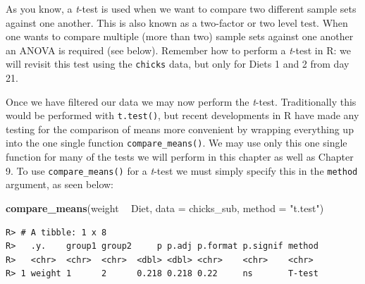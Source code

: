 \documentclass[english,10pt,a4paper,oneside]{book}
\newenvironment{Shaded}{\begin{snugshade}}{\end{snugshade}}
\newcommand{\KeywordTok}[1]{\textcolor[rgb]{0.13,0.29,0.53}{\textbf{#1}}}
\newcommand{\DataTypeTok}[1]{\textcolor[rgb]{0.13,0.29,0.53}{#1}}
\newcommand{\DecValTok}[1]{\textcolor[rgb]{0.00,0.00,0.81}{#1}}
\newcommand{\StringTok}[1]{\textcolor[rgb]{0.31,0.60,0.02}{#1}}
\newcommand{\CommentTok}[1]{\textcolor[rgb]{0.56,0.35,0.01}{\textit{#1}}}
\newcommand{\OperatorTok}[1]{\textcolor[rgb]{0.81,0.36,0.00}{\textbf{#1}}}
\newcommand{\NormalTok}[1]{#1}
\theoremstyle{definition}
\theoremstyle{definition}
\theoremstyle{definition}
\theoremstyle{remark}
\begin{document}
As you know, a \emph{t}-test is used when we want to compare two
different sample sets against one another. This is also known as a
two-factor or two level test. When one wants to compare multiple (more
than two) sample sets against one another an ANOVA is required (see
below). Remember how to perform a \emph{t}-test in R: we will revisit
this test using the \texttt{chicks} data, but only for Diets 1 and 2
from day 21.

\begin{Shaded}
\end{Shaded}

Once we have filtered our data we may now perform the \emph{t}-test.
Traditionally this would be performed with \texttt{t.test()}, but recent
developments in R have made any testing for the comparison of means more
convenient by wrapping everything up into the one single function
\texttt{compare\_means()}. We may use only this one single function for
many of the tests we will perform in this chapter as well as Chapter 9.
To use \texttt{compare\_means()} for a \emph{t}-test we must simply
specify this in the \texttt{method} argument, as seen below:

\begin{Shaded}
\begin{Highlighting}[]
\KeywordTok{compare_means}\NormalTok{(weight }\OperatorTok{~}\StringTok{ }\NormalTok{Diet, }\DataTypeTok{data =}\NormalTok{ chicks_sub, }\DataTypeTok{method =} \StringTok{"t.test"}\NormalTok{)}
\end{Highlighting}
\end{Shaded}

\begin{verbatim}
R> # A tibble: 1 x 8
R>   .y.    group1 group2     p p.adj p.format p.signif method
R>   <chr>  <chr>  <chr>  <dbl> <dbl> <chr>    <chr>    <chr> 
R> 1 weight 1      2      0.218 0.218 0.22     ns       T-test
\end{verbatim}
\end{document}

